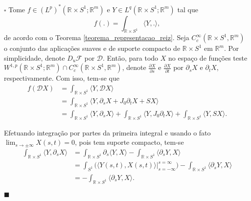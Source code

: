 \documentclass[12pt]{book}
\newenvironment{prova}[1]{$\square$ #1}{\hfill$\blacksquare$}
\newcommand{\bigparenteses}[1]{\Big( #1 \Big) }
\newcommand{\circulo}{S^{1}}
\newcommand{\diferencialfloerponto}[1]{D_{#1}\operadorFloer}
\newcommand{\diferencialfloerabrev}{\mathcal{D}}
\newcommand{\derivadaparcial}[2]{\frac{\partial #1}{\partial #2}}
\newcommand{\derivadaparcialabrev}[1]{\partial_{#1}}
\newcommand{\espacoLpGeral}[2]{L^{#1}(#2)}
\newcommand{\espacoLpdual}{(L^{p})^{*}(\retacartesianocirculo;\real{m})}
\newcommand{\espacosobolevcontradominio}[2]{W^{1,p}(#1;#2)}
\newcommand{\estruturacomplexa}{J_{0}}
\newcommand{\funcoessupcompactcontradom}[2]{C^{\infty}_{c}(#1, #2)}
\newcommand{\operadorFloer}{\mathcal{F}}
\newcommand{\produtointerno}[2]{\langle #1, #2 \rangle}
\newcommand{\retacartesianocirculo}{\real{} \times \circulo}
\newcommand{\real}[1]{\mathbb{R}^{#1}}
\begin{document}
	\begin{prova} Tome $f \in \espacoLpdual$ e $Y \in \espacoLpGeral{q}{\retacartesianocirculo;\real{m}}$ tal que 
		$$
		f(.) = \int_{\retacartesianocirculo}\produtointerno{Y}{.},
		$$
		de acordo com o Teorema \ref{teorema_representacao_reiz}. Seja  $\funcoessupcompactcontradom{\retacartesianocirculo}{\real{m}}$ o conjunto das aplicações suaves e de suporte compacto de $\retacartesianocirculo$ em $\real{m}$. Por simplicidade, denote $\diferencialfloerponto{u}$ por $\diferencialfloerabrev$. Então, para todo $X$ no espaço de funções teste $\espacosobolevcontradominio{\retacartesianocirculo}{\real{m}} \cap \funcoessupcompactcontradom{\retacartesianocirculo}{\real{m}}$, denote $\derivadaparcial{X}{s}$ e $\derivadaparcial{X}{t}$ por $\derivadaparcialabrev{s}X$ e $\derivadaparcialabrev{t}X$, respectivamente. Com isso, tem-se que
		$$
		\begin{aligned}
		f(\diferencialfloerabrev X)
		&= \int_{\retacartesianocirculo}\produtointerno{Y}{\diferencialfloerabrev X}
		\\
		&=\int_{\retacartesianocirculo}\produtointerno{Y}{\derivadaparcialabrev{s}X+\estruturacomplexa\derivadaparcialabrev{t}X+S X}
		\\
		&=
		\int_{\retacartesianocirculo}\produtointerno{Y}{\derivadaparcialabrev{s}X} + \int_{\retacartesianocirculo}\produtointerno{Y}{\estruturacomplexa \derivadaparcialabrev{t}X} + \int_{\retacartesianocirculo}\produtointerno{Y}{S X}.
		\end{aligned}
		$$
		
		Efetuando integração por partes da primeira integral e usando o fato $ \lim_{s\to \pm \infty} X(s,t) = 0$, pois tem suporte compacto, tem-se
		$$
		\begin{aligned}
		\int_{\retacartesianocirculo}\produtointerno{Y}{\derivadaparcialabrev{s}X}
		&=\int_{\retacartesianocirculo}\derivadaparcialabrev{s} \produtointerno{Y}{ X} - \int_{\retacartesianocirculo}\produtointerno{\derivadaparcialabrev{s}Y}{ X} 
		\\
		&=\int_{\circulo}\bigparenteses{\produtointerno{Y(s,t)}{ X(s,t)}\Big|_{s=-\infty}^{s=\infty}} -\int_{\retacartesianocirculo}\produtointerno{\derivadaparcialabrev{s}Y}{ X}
		\\
		&=-\int_{\retacartesianocirculo}\produtointerno{\derivadaparcialabrev{s}Y}{ X}.
		\end{aligned}
		$$
		

\end{prova}
\end{document}
